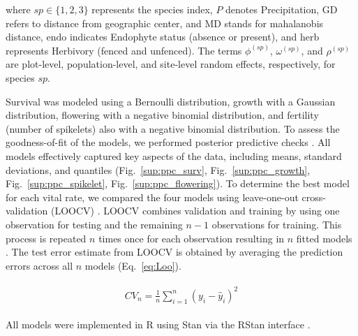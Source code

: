 \documentclass[12pt]{article}\usepackage[]{graphicx}\usepackage[dvipsnames]{xcolor}
\begin{document}
\noindent where \( sp \in \{1, 2, 3\} \) represents the species index, \( P \) denotes Precipitation, 
\( \text{GD} \) refers to distance from geographic center, and \( \text{MD} \) stands for mahalanobis distance, \( \text{endo} \) indicates Endophyte status (absence or present), and \( \text{herb} \) represents Herbivory (fenced and unfenced). The terms \( \phi^{(sp)} \), \( \omega^{(sp)} \), and \( \rho^{(sp)} \) are plot-level, population-level, and site-level random effects, respectively, for species \( sp \).

Survival was modeled using a Bernoulli distribution, growth with a Gaussian distribution, flowering with a negative binomial distribution, and fertility (number of spikelets) also with a negative binomial distribution.
To assess the goodness-of-fit of the models, we performed posterior predictive checks \citep{gelman2000diagnostic, berkhof2000posterior}.  
All models effectively captured key aspects of the data, including means, standard deviations, and quantiles (Fig.~\ref{sup:ppc_surv}, Fig.~\ref{sup:ppc_growth}, Fig.~\ref{sup:ppc_spikelet}, Fig.~\ref{sup:ppc_flowering}).
To determine the best model for each vital rate, we compared the four models using leave-one-out cross-validation (LOOCV) \citep{vehtari2017practical}.  
LOOCV combines validation and training by using one observation for testing and the remaining $n-1$ observations for training.  
This process is repeated $n$ times once for each observation resulting in $n$ fitted models \citep{silva2024robust}.  
The test error estimate from LOOCV is obtained by averaging the prediction errors across all $n$ models (Eq.~\ref{eq:Loo}).

\begin{align}\label{eq:Loo}
\begin{split}
CV_{n} = \frac{1}{n} \sum_{i=1}^{n} (y_{i} - \hat{y}_{i})^2
\end{split}
\end{align}

All models were implemented in R \citep{RCoreTeam} using Stan via the RStan interface \citep{Rstan}.



\end{document}
